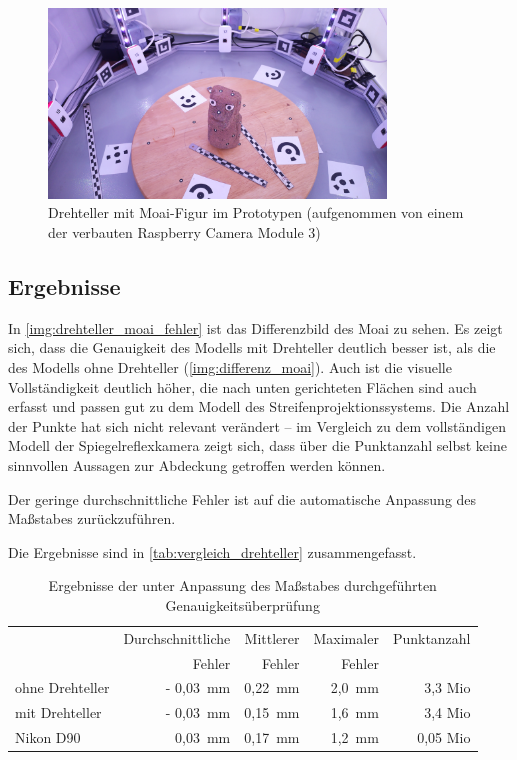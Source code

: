 \documentclass[./00PhotoBox.tex]{subfiles}
\begin{document}
\begin{figure}
    \centering
    \includegraphics[width=0.8\textwidth]{img/drehteller_moai.jpg}
    \caption{Drehteller mit Moai-Figur im Prototypen (aufgenommen von einem der verbauten Raspberry Camera Module 3)}
    \label{img:drehteller_moai}
\end{figure}

\subsection{Ergebnisse}

In \autoref{img:drehteller_moai_fehler} ist das Differenzbild des Moai zu sehen. Es zeigt sich, dass die Genauigkeit des Modells mit Drehteller deutlich besser ist, als die des Modells ohne Drehteller (\autoref{img:differenz_moai}). Auch ist die visuelle Vollständigkeit deutlich höher, die nach unten gerichteten Flächen sind auch erfasst und passen gut zu dem Modell des Streifenprojektionssystems. Die Anzahl der Punkte hat sich nicht relevant verändert -- im Vergleich zu dem vollständigen Modell der Spiegelreflexkamera zeigt sich, dass über die Punktanzahl selbst keine sinnvollen Aussagen zur Abdeckung getroffen werden können.

Der geringe durchschnittliche Fehler ist auf die automatische Anpassung des Maßstabes zurückzuführen.

Die Ergebnisse sind in \autoref{tab:vergleich_drehteller} zusammengefasst.

\begin{table}
    \centering
    \caption{Ergebnisse der unter Anpassung des Maßstabes durchgeführten Genauigkeitsüberprüfung}
    \label{tab:vergleich_drehteller}
    \begin{tabular}{l|r|r|r|r}
        \toprule
                        & Durchschnittliche & Mittlerer & Maximaler & Punktanzahl \\
                        & Fehler            & Fehler    & Fehler    &             \\
        \midrule
        ohne Drehteller & - 0,03~mm         & 0,22~mm   & 2,0~mm    & 3,3 Mio     \\
        mit Drehteller  & - 0,03~mm         & 0,15~mm   & 1,6~mm    & 3,4 Mio     \\
        Nikon D90       & 0,03~mm           & 0,17~mm   & 1,2~mm    & 0,05 Mio    \\
        \bottomrule
    \end{tabular}
\end{table}
\end{document}
